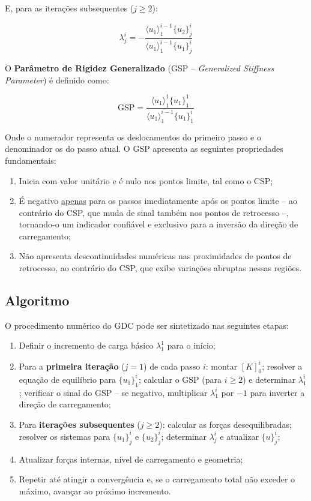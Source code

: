 \begin{textocaixa}
E, para as iterações subsequentes ($j \geq 2$):

\begin{equation}
	\lambda^{i}_{j} = -\frac{\langle u_1 \rangle^{i-1}_{1}\{u_2\}^{i}_{j}}
							{\langle u_1 \rangle^{i-1}_{1}\{u_1\}^{i}_{j}}
\end{equation}

O \textbf{Parâmetro de Rigidez Generalizado} (GSP --
\textit{Generalized Stiffness Parameter}) é definido como:

\begin{equation}
	\text{GSP} = \frac{\langle u_1 \rangle^{1}_{1}\{u_1\}^{1}_{1}}
					  {\langle u_1 \rangle^{i-1}_{1}\{u_1\}^{i}_{1}}
\end{equation}

Onde o numerador representa os deslocamentos do primeiro passo e o denominador os do passo
atual. O GSP apresenta as seguintes propriedades fundamentais:

\begin{enumerate}
	\item Inicia com valor unitário e é nulo nos pontos limite, tal como o CSP;
	\item É negativo \underline{apenas} para os passos imediatamente após os pontos limite
	-- ao contrário do CSP, que muda de sinal também nos pontos de retrocesso --, tornando-o
	um indicador confiável e exclusivo para a inversão da direção de carregamento;
	\item Não apresenta descontinuidades numéricas nas proximidades de pontos de retrocesso,
	ao contrário do CSP, que exibe variações abruptas nessas regiões.
\end{enumerate}

\subsection*{Algoritmo}

O procedimento numérico do GDC pode ser sintetizado nas seguintes etapas:

\begin{enumerate}
	\item Definir o incremento de carga básico $\lambda^{1}_{1}$ para o início;
	\item Para a \textbf{primeira iteração} ($j = 1$) de cada passo $i$: montar
	$[K]^{i}_{0}$; resolver a equação de equilíbrio para $\{u_1\}^{i}_{1}$; calcular o GSP
	(para $i \geq 2$) e determinar $\lambda^{i}_{1}$; verificar o sinal do GSP -- se
	negativo, multiplicar $\lambda^{i}_{1}$ por $-1$ para inverter a direção de carregamento;
	\item Para \textbf{iterações subsequentes} ($j \geq 2$): calcular as forças
	desequilibradas; resolver os sistemas para $\{u_1\}^{i}_{j}$ e $\{u_2\}^{i}_{j}$;
	determinar $\lambda^{i}_{j}$ e atualizar $\{u\}^{i}_{j}$;
	\item Atualizar forças internas, nível de carregamento e geometria;
	\item Repetir até atingir a convergência e, se o carregamento total não exceder o
	máximo, avançar ao próximo incremento.
\end{enumerate}


\end{textocaixa}
